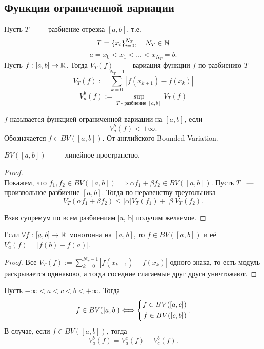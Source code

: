\subsection{Функции ограниченной вариации}
\begin{definition}
	Пусть $T$ ~---~ разбиение отрезка $[a, b]$, т.е. \[
		T = \{x_i\}_{i=0}^{N_T}, \quad N_T \in \mathbb{N}
	\]\[
		a = x_0 < x_1 < \dots < x_{N_T} = b.
	\]
	Пусть $f: [a, b] \rightarrow \mathbb{R}$. Тогда $V_T(f)$ ~---~ вариация функции $f$ по разбиению $T$\[
		V_T(f) := \sum_{k=0}^{N_T-1} |f(x_{k+1}) - f(x_k)|
	\]
	\[
		V_a^b(f) := \sup_{T\text{ - разбиение } [a, b]} V_T(f)
	\]
\end{definition}
\begin{definition}
	$f$ называется функцией ограниченной вариации на $[a, b]$, если\[
	V_a^b (f) < +\infty.
	\]
	Обозначается $f\in BV([a, b])$. От английского Bounded Variation.
\end{definition}
\begin{theorem}
	$BV([a,b])$ ~---~ линейное пространство.
\end{theorem}
\begin{proof} \ \\
	Покажем, что $f_1, f_2 \in BV([a, b]) \implies \alpha f_1 + \beta f_2 \in BV([a, b])$. Пусть $T$ ~---~ произвольное разбиение $[a, b]$. Тогда по неравенству треугольника \[
		V_T(\alpha f_1 + \beta f_2)
		\leq
		|\alpha| V_T(f_1) + |\beta| V_T(f_2).
	\]

	Взяв супремум по всем разбиениям [a, b] получим желаемое.
\end{proof}
\begin{lemma}
	Если $\forall f: [a, b] \rightarrow \mathbb{R}$ монотонна на $[a, b]$, то $f \in BV([a, b])$ и её $V_a^b (f) = |f(b) - f(a)|$.
\end{lemma}
\begin{proof}
	Все $V_T(f) := \sum_{k=0}^{N_T-1} |f(x_{k+1}) - f(x_k)|$ одного знака, то есть модуль раскрывается одинаково, а тогда соседние слагаемые друг друга уничтожают.
\end{proof}
\begin{lemma}
	Пусть $-\infty < a < c < b < +\infty$. Тогда
	\[
	f \in BV([a, b]) \Longleftrightarrow \left\{\begin{aligned}f \in BV([a, c]) \\ f \in BV([c, b])\end{aligned}\right..
	\]
	В случае, если $f \in BV([a, b])$, тогда \[
		V_a^b (f) = V_a^c (f) + V_c^b (f).
	\]
\end{lemma}

